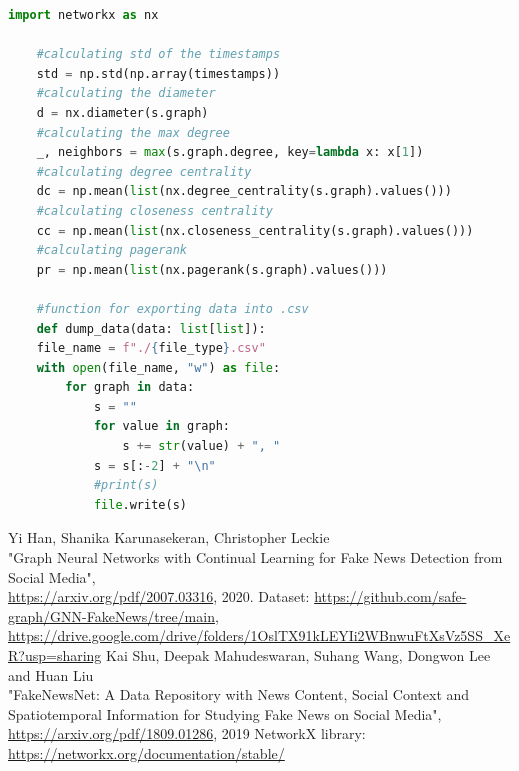 \documentclass[11pt,a4paper]{article}
\begin{document}
\begin{lstlisting}[language=Python]
    import networkx as nx

    #calculating std of the timestamps
    std = np.std(np.array(timestamps))
    #calculating the diameter
    d = nx.diameter(s.graph)
    #calculating the max degree
    _, neighbors = max(s.graph.degree, key=lambda x: x[1])
    #calculating degree centrality
    dc = np.mean(list(nx.degree_centrality(s.graph).values()))
    #calculating closeness centrality
    cc = np.mean(list(nx.closeness_centrality(s.graph).values()))
    #calculating pagerank
    pr = np.mean(list(nx.pagerank(s.graph).values()))

	#function for exporting data into .csv
    def dump_data(data: list[list]):
    file_name = f"./{file_type}.csv"
    with open(file_name, "w") as file:
        for graph in data:
            s = ""
            for value in graph:
                s += str(value) + ", "
            s = s[:-2] + "\n"
            #print(s)
            file.write(s)
\end{lstlisting}



\newpage

\begin{thebibliography}{9}
	 Yi Han, Shanika Karunasekeran, Christopher Leckie\\"Graph Neural Networks with Continual Learning for Fake News Detection from Social Media",\\ \url{https://arxiv.org/pdf/2007.03316}, 2020.
	 Dataset: \url{https://github.com/safe-graph/GNN-FakeNews/tree/main},\\\url{https://drive.google.com/drive/folders/1OslTX91kLEYIi2WBnwuFtXsVz5SS_XeR?usp=sharing}
	 Kai Shu, Deepak Mahudeswaran, Suhang Wang, Dongwon Lee and Huan Liu\\"FakeNewsNet: A Data Repository with News Content, Social Context and Spatiotemporal Information for Studying Fake News on Social Media",\\ \url{https://arxiv.org/pdf/1809.01286}, 2019
	 NetworkX library: \url{https://networkx.org/documentation/stable/}
\end{thebibliography}

\newpage
\end{document}
